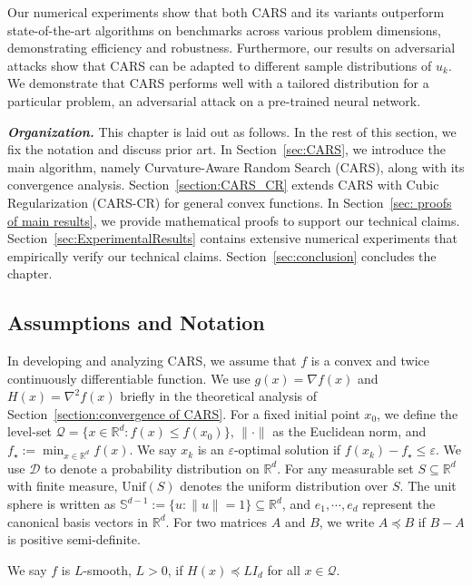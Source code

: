 Our numerical experiments show that both CARS and its variants outperform state-of-the-art algorithms on benchmarks across various problem dimensions, demonstrating efficiency and robustness. Furthermore, our results on adversarial attacks show that CARS can be adapted to different sample distributions of $u_k$. We demonstrate that CARS performs well with a tailored distribution for a particular problem, an adversarial attack on a pre-trained neural network.

\vspace{0.1in}
\noindent\textit{\textbf{Organization.}}\quad
This chapter is laid out as follows. In the rest of this section, we fix the notation and discuss prior art. In Section~\ref{sec:CARS}, we introduce the main algorithm, namely Curvature-Aware Random Search (CARS), along with its convergence analysis.
Section~\ref{section:CARS_CR} extends CARS with Cubic Regularization (CARS-CR) for general convex functions. In Section~\ref{sec: proofs of main results}, we provide mathematical proofs to support our technical claims. Section~\ref{sec:ExperimentalResults} contains extensive numerical experiments that empirically verify our technical claims. Section~\ref{sec:conclusion} concludes the chapter.

\subsection{Assumptions and Notation}
\label{sec:Notation}
In developing and analyzing CARS, we assume that $f$ is a convex and twice continuously differentiable function. We use $g(x) = \nabla f(x)$ and $H(x) = \nabla^2 f(x)$ briefly in the theoretical analysis of Section~\ref{section:convergence of CARS}. For a fixed initial point $x_0$, we define the level-set $\mathcal{Q} = \{x\in\mathbb{R}^d : f(x)\leq f(x_0)\}$, $\|\cdot\|$ as the Euclidean norm, and $f_{\star} := \min_{x\in\mathbb{R}^{d}}f(x)$. We say $x_k$ is an $\varepsilon$-optimal solution if $f(x_k) - f_{\star} \leq \varepsilon$. We use $\mathcal{D}$ to denote a probability distribution on $\mathbb{R}^{d}$. For any measurable set $S \subseteq \mathbb{R}^{d}$ with finite measure, $\mathrm{Unif}(S)$ denotes the uniform distribution over $S$. The unit sphere is written as $\mathbb{S}^{d-1}:= \{u: \|u\| = 1\}\subseteq \mathbb{R}^{d}$, and $e_1,\cdots, e_d$ represent the canonical basis vectors in $\mathbb{R}^{d}$. For two matrices $A$ and $B$, we write $A\preceq B$ if $B-A$ is positive semi-definite.


\begin{definition}
    \label{Definition: smoothness}
    We say $f$ is $L$-smooth, $L>0$, if $H(x) \preceq L I_d$ for all $x \in \mathcal{Q}$.
\end{definition}

